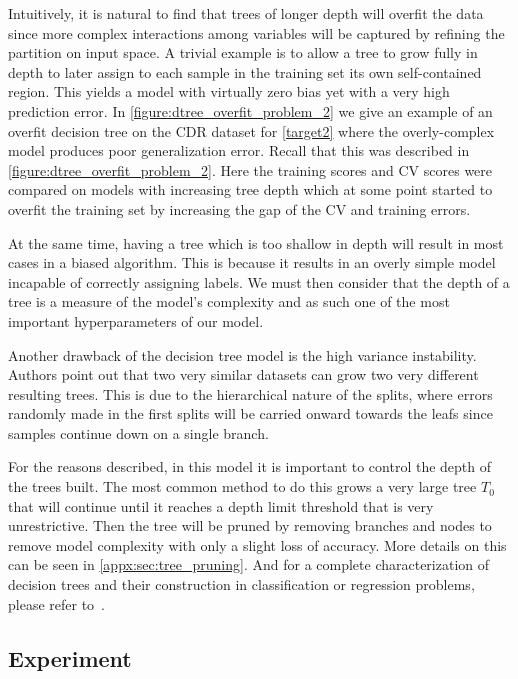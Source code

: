 Intuitively, it is natural to find that trees of longer depth will overfit the data since more complex interactions among variables will be captured by refining the partition on input space.
A trivial example is to allow a tree to grow fully in depth to later assign to each sample in the training set its own self-contained region.
This yields a model with virtually zero bias yet with a very high prediction error.
In \cref{figure:dtree_overfit_problem_2} we give an example of an overfit decision tree on the CDR dataset for \cref{target2} where the overly-complex model produces poor generalization error.
Recall that this was described in \cref{figure:dtree_overfit_problem_2}.
Here the training scores and CV scores were compared on models with increasing tree depth which at some point started to overfit the training set by increasing the gap of the CV and training errors.

At the same time, having a tree which is too shallow in depth will result in most cases in a biased algorithm.
This is because it results in an overly simple model incapable of correctly assigning labels.
We must then consider that the depth of a tree is a measure of the model's complexity and as such one of the most important hyperparameters of our model.

Another drawback of the decision tree model is the high variance instability.
Authors point out that two very similar datasets can grow two very different resulting trees.
This is due to the hierarchical nature of the splits, where errors randomly made in the first splits will be carried onward towards the leafs since samples continue down on a single branch.

For the reasons described, in this model it is important to control the depth of the trees built.
The most common method to do this grows a very large tree $T_0$ that will continue until it reaches a depth limit threshold that is very unrestrictive.
Then the tree will be pruned by removing branches and nodes to remove model complexity with only a slight loss of accuracy.
More details on this can be seen in \cref{appx:sec:tree_pruning}.
And for a complete characterization of decision trees and their construction in classification or regression problems, please refer to~\cite{breiman-cart84}.

\subsection{Experiment}\label{subsection:decision_trees_experiment}

